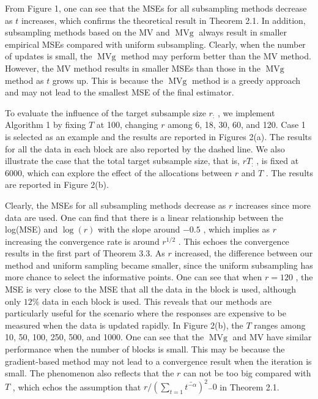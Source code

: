 From Figure 1, one can see that the MSEs for all subsampling methods
decrease as \(t\) increases, which confirms the theoretical result in
Theorem 2.1. In addition, subsampling methods based on the MV and
\(\operatorname { M V g }\) always result in smaller empirical MSEs
compared with uniform subsampling. Clearly, when the number of updates
is small, the \(\operatorname { M V g }\) method may perform better than
the MV method. However, the MV method results in smaller MSEs than those
in the \(\operatorname { M V g }\) method as \(t\) grows up. This is
because the \(\operatorname { M V g }\) method is a greedy approach and
may not lead to the smallest MSE of the final estimator.

To evaluate the influence of the target subsample size \(r _ { : }\) ,
we implement Algorithm 1 by fixing \(T\) at 100, changing \(r\) among 6,
18, 30, 60, and 120. Case 1 is selected as an example and the results
are reported in Figures 2(a). The results for all the data in each block
are also reported by the dashed line. We also illustrate the case that
the total target subsample size, that is, \(r T _ { : }\) , is fixed at
6000, which can explore the effect of the allocations between \(r\) and
\(T\) . The results are reported in Figure 2(b).

Clearly, the MSEs for all subsampling methods decrease as \(r\)
increases since more data are used. One can find that there is a linear
relationship between the log(MSE) and \(\log ( r )\) with the slope
around \(- 0 . 5\) , which implies as \(r\) increasing the convergence
rate is around \(r ^ { 1 / 2 }\) . This echoes the convergence results
in the first part of Theorem 3.3. As \(r\) increased, the difference
between our method and uniform sampling became smaller, since the
uniform subsampling has more chance to select the informative points.
One can see that when \(r = 1 2 0\) , the MSE is very close to the MSE
that all the data in the block is used, although only \(12 \%\) data in
each block is used. This reveals that our methods are particularly
useful for the scenario where the responses are expensive to be measured
when the data is updated rapidly. In Figure 2(b), the \(T\) ranges among
10, 50, 100, 250, 500, and 1000. One can see that the
\(\operatorname { M V g }\) and MV have similar performance when the
number of blocks is small. This may be because the gradient-based method
may not lead to a convergence result when the iteration is small. The
phenomenon also reflects that the \(r\) can not be too big compared with
\(T\) , which echos the assumption that
\(r / ( \sum _ { t = 1 } \bar { t ^ { - \alpha } } ) ^ { 2 } \stackrel { - } {  } 0\)
in Theorem 2.1.

